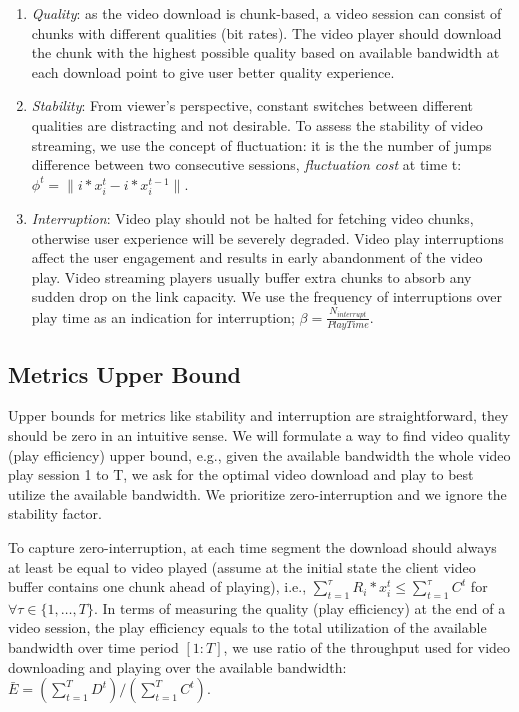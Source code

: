 \begin{enumerate}
\item\textit{Quality}: as the video download is chunk-based, a video session can consist of chunks with different qualities (bit rates). The video player should download the chunk with the highest possible quality based on available bandwidth at each download point to give user better quality experience. 

\item\textit{Stability}: From viewer's perspective, constant switches between different qualities are distracting and not desirable. To assess the stability of video streaming, we use the concept of fluctuation: it is the the number of jumps difference between two consecutive sessions, \emph{fluctuation cost} at time t: $\phi^t =  \|i*x_i^t - i*x_i^{t-1}\|$.

\item\textit{Interruption}: Video play should not be halted for fetching video chunks, otherwise user experience will be severely degraded. Video play interruptions affect the user engagement and results in early abandonment of the video play. Video streaming players usually buffer extra chunks to absorb any sudden drop on the link capacity. We use the frequency of interruptions over play time as an indication for interruption; $\beta = \frac{N_{interrupt}}{PlayTime}$.
\end{enumerate}

\subsection{Metrics Upper Bound}\label{subsec:offline}
Upper bounds for metrics like stability and interruption are straightforward, they should be zero in an intuitive sense. We will formulate a way to find video quality (play efficiency) upper bound, e.g., given the available bandwidth the whole video play session 1 to T, we ask for the optimal video download and play to best utilize the available bandwidth. We prioritize zero-interruption and we ignore the stability factor. 

To capture zero-interruption, at each time segment the download should always at least be equal to video played (assume at the initial state the client video buffer contains one chunk ahead of playing), i.e., $\sum \limits_{t=1}^\tau R_i * x_i^t\leq\sum\limits_{t=1}^\tau C^t$ for $\forall \tau \in \{1, \dots, T\}$. In terms of measuring the quality (play efficiency) at the end of a video session, the play efficiency equals to the total utilization of the available bandwidth over time period $[1:T]$, we use ratio of the throughput used for video downloading and playing over the available bandwidth: $\bar{E}=(\sum\limits_{t=1}^T D^t)/(\sum\limits_{t=1}^T C^t)$.

